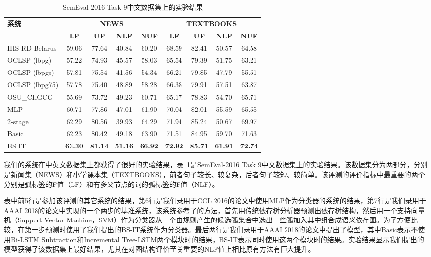 \begin{table}[htpb]
	\centering
	\begin{tabular}{l||cc|cc||cc|cc}
		\hline
		\multirow{2}{*}{\bf 系统}&\multicolumn{4}{c}{\bf NEWS}&\multicolumn{4}{c}{\bf TEXTBOOKS}\\
		\cline{2-9}
		&\bf LF&\bf UF&\bf NLF&\bf NUF&\bf LF&\bf UF&\bf NLF&\bf NUF\\
		\hline
		IHS-RD-Belarus&59.06&77.64&40.84&60.20&68.59&82.41&50.57&64.58\\
		OCLSP (lbpg)&57.22&74.93&45.57&58.03&65.54&79.39&51.75&63.21\\
		OCLSP (lbpgs)&57.81&75.54&41.56&54.34&66.21&79.85&47.79&55.51\\
		OCLSP (lbpg75)&57.78&75.40&48.89&58.28&66.38&79.91&57.51&63.87\\
		OSU\_CHGCG&55.69&73.72&49.23&60.71&65.17&78.83&54.70&65.71\\
		\hline
		MLP & 60.71&77.86&47.01&61.90&70.04&82.01&55.59&65.55 \\ 
		\hline
		2-stage & 62.29&80.56&39.93&64.29&71.94&85.24&50.67&69.97 \\ 
		\hline
		Basic&62.23&80.42&49.18&63.90&71.51&84.95&59.70&71.63\\
		BS-IT&\bf63.30&\bf81.14&\bf51.16&\bf66.92&\bf72.92&\bf85.71&\bf61.91&\bf72.74\\
		\hline
	\end{tabular}
	\caption{SemEval-2016 Task 9中文数据集上的实验结果}
	\label{tbl:result-semeval16}
	\vspace{-0.3em}
\end{table}

我们的系统在中英文数据集上都获得了很好的实验结果，表~\ref{tbl:result-semeval16}是SemEval-2016 Task 9中文数据集上的实验结果。该数据集分为两部分，分别是新闻集（NEWS）和小学课本集（TEXTBOOKS），前者句子较长、较复杂，后者句子较短、较简单。该评测的评价指标中最重要的两个分别是弧标签的F值（LF）和有多父节点的词的弧标签的F值（NLF）。

表中前5行是参加该评测的其它系统的结果，第6行是我们录用于CCL 2016的论文中使用MLP作为分类器的系统的结果，第7行是我们录用于AAAI 2018的论文中实现的一个两步的基准系统，该系统参考了的方法，首先用传统依存树分析器预测出依存树结构，然后用一个支持向量机（Support Vector Machine，SVM）作为分类器从一个由规则产生的候选弧集合中选出一些弧加入其中组合成语义依存图。为了方便比较，在第一步预测时使用了我们提出的BS-IT系统作为分类器。最后两行是我们录用于AAAI 2018的论文中提出了模型，其中Basic表示不使用Bi-LSTM Subtraction和Incremental Tree-LSTM两个模块时的结果，BS-IT表示同时使用这两个模块时的结果。实验结果显示我们提出的模型获得了该数据集上最好结果，尤其在对图结构评价至关重要的NLF值上相比原有方法有巨大提升。

